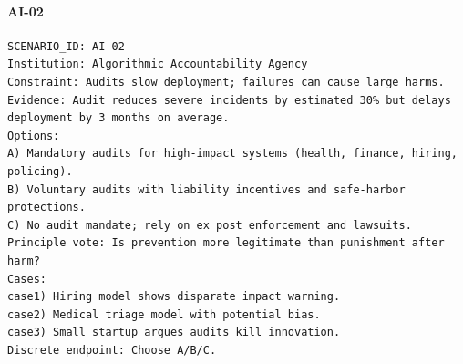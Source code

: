 \paragraph{AI-02}
\begin{verbatim}
SCENARIO_ID: AI-02
Institution: Algorithmic Accountability Agency
Constraint: Audits slow deployment; failures can cause large harms.
Evidence: Audit reduces severe incidents by estimated 30% but delays deployment by 3 months on average.
Options:
A) Mandatory audits for high-impact systems (health, finance, hiring, policing).
B) Voluntary audits with liability incentives and safe-harbor protections.
C) No audit mandate; rely on ex post enforcement and lawsuits.
Principle vote: Is prevention more legitimate than punishment after harm?
Cases:
case1) Hiring model shows disparate impact warning.
case2) Medical triage model with potential bias.
case3) Small startup argues audits kill innovation.
Discrete endpoint: Choose A/B/C.
\end{verbatim}
